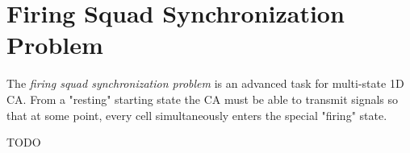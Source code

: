 \section{Firing Squad Synchronization Problem}
The \textit{firing squad synchronization problem} is an advanced task for multi-state 1D CA.
From a "resting" starting state the CA must be able to transmit signals so that at some point, every cell simultaneously enters the special "firing" state.

TODO
